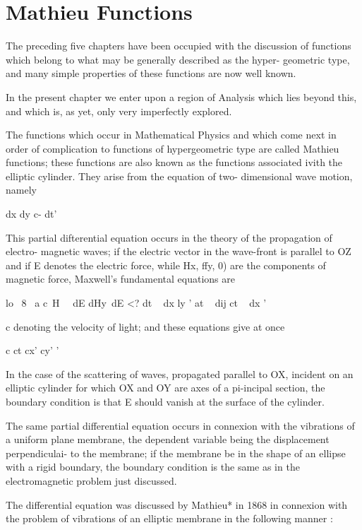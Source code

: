 %
%
\chapter{Mathieu Functions}

The preceding five chapters have been occupied with the discussion of
functions which belong to what may be generally described as the
hyper- geometric type, and many simple properties of these functions
are now well known.

In the present chapter we enter upon a region of Analysis which lies
beyond this, and which is, as yet, only very imperfectly explored.

The functions which occur in Mathematical Physics and which come next
in order of complication to functions of hypergeometric type are
called Mathieu functions; these functions are also known as the
functions associated ivith the elliptic cylinder. They arise from the
equation of two- dimensional wave motion, namely

dx dy c- dt'

This partial difterential equation occurs in the theory of the
propagation of electro- magnetic waves; if the electric vector in the
wave-front is parallel to OZ and if E denotes the electric force,
while Hx, ffy, 0) are the components of magnetic force, Maxwell's
fundamental equations are

lo \ 8 \ a c\ H \ \ dE dHy\ dE <? dt ~ dx ly ' at ~ dij ct ~ dx '

c denoting the velocity of light; and these equations give at once

c ct cx' cy' '

In the case of the scattering of waves, propagated parallel to OX,
incident on an elliptic cylinder for which OX and OY are axes of a
pi-incipal section, the boundary condition is that E should vanish at
the surface of the cylinder.

The same partial differential equation occurs in connexion with the
vibrations of a uniform plane membrane, the dependent variable being
the displacement perpendiculai- to the membrane; if the membrane be
in the shape of an ellipse with a rigid boundary, the boundary
condition is the same as in the electromagnetic problem just
discussed.

The differential equation was discussed by Mathieu* in 1868 in
connexion with the problem of vibrations of an elliptic membrane in
the following manner :

